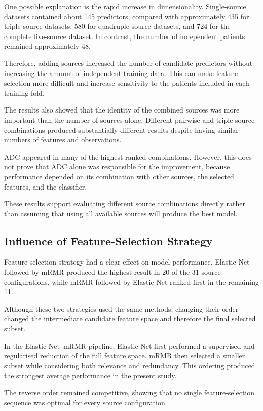 \documentclass[12pt,twocolumn]{article}
\begin{document}
One possible explanation is the rapid increase in dimensionality.
Single-source datasets contained about 145 predictors, compared with
approximately 435 for triple-source datasets, 580 for quadruple-source
datasets, and 724 for the complete five-source dataset. In contrast,
the number of independent patients remained approximately 48.

Therefore, adding sources increased the number of candidate predictors
without increasing the amount of independent training data. This can
make feature selection more difficult and increase sensitivity to the
patients included in each training fold.

The results also showed that the identity of the combined sources was
more important than the number of sources alone. Different pairwise
and triple-source combinations produced substantially different
results despite having similar numbers of features and observations.

ADC appeared in many of the highest-ranked combinations. However, this
does not prove that ADC alone was responsible for the improvement,
because performance depended on its combination with other sources,
the selected features, and the classifier.

These results support evaluating different source combinations
directly rather than assuming that using all available sources will
produce the best model.


\subsection{Influence of Feature-Selection Strategy}
\label{subsec:discussion_feature_selection}

Feature-selection strategy had a clear effect on model performance.
Elastic Net followed by mRMR produced the highest result in 20 of the
31 source configurations, while mRMR followed by Elastic Net ranked
first in the remaining 11.

Although these two strategies used the same methods, changing their
order changed the intermediate candidate feature space and therefore
the final selected subset.

In the Elastic-Net--mRMR pipeline, Elastic Net first performed a
supervised and regularised reduction of the full feature space. mRMR
then selected a smaller subset while considering both relevance and
redundancy. This ordering produced the strongest average performance
in the present study.

The reverse order remained competitive, showing that no single
feature-selection sequence was optimal for every source configuration.
\end{document}
